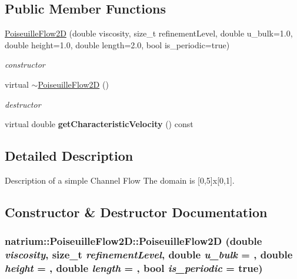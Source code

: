 \subsection*{Public Member Functions}
\begin{DoxyCompactItemize}
\item 
\hyperlink{classnatrium_1_1PoiseuilleFlow2D_a377e6996a9b45552b9a56aa96d0325ee}{PoiseuilleFlow2D} (double viscosity, size\_\-t refinementLevel, double u\_\-bulk=1.0, double height=1.0, double length=2.0, bool is\_\-periodic=true)
\begin{DoxyCompactList}\small\item\em constructor \item\end{DoxyCompactList}\item 
\hypertarget{classnatrium_1_1PoiseuilleFlow2D_a62f9e7cfb2e32753b58eafb9d5936fd4}{
virtual \hyperlink{classnatrium_1_1PoiseuilleFlow2D_a62f9e7cfb2e32753b58eafb9d5936fd4}{$\sim$PoiseuilleFlow2D} ()}
\label{classnatrium_1_1PoiseuilleFlow2D_a62f9e7cfb2e32753b58eafb9d5936fd4}

\begin{DoxyCompactList}\small\item\em destructor \item\end{DoxyCompactList}\item 
\hypertarget{classnatrium_1_1PoiseuilleFlow2D_ae3c247688d49d23a5b0940e22f795309}{
virtual double {\bfseries getCharacteristicVelocity} () const }
\label{classnatrium_1_1PoiseuilleFlow2D_ae3c247688d49d23a5b0940e22f795309}

\end{DoxyCompactItemize}


\subsection{Detailed Description}
Description of a simple Channel Flow The domain is \mbox{[}0,5\mbox{]}x\mbox{[}0,1\mbox{]}. 

\subsection{Constructor \& Destructor Documentation}
\hypertarget{classnatrium_1_1PoiseuilleFlow2D_a377e6996a9b45552b9a56aa96d0325ee}{
\subsubsection[{PoiseuilleFlow2D}]{\setlength{\rightskip}{0pt plus 5cm}natrium::PoiseuilleFlow2D::PoiseuilleFlow2D (double {\em viscosity}, \/  size\_\-t {\em refinementLevel}, \/  double {\em u\_\-bulk} = {}, \/  double {\em height} = {}, \/  double {\em length} = {}, \/  bool {\em is\_\-periodic} = {\ttfamily true})}}
\label{classnatrium_1_1PoiseuilleFlow2D_a377e6996a9b45552b9a56aa96d0325ee}


